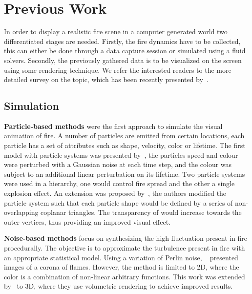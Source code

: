\chapter{Previous Work}
\label{ch:previous_work}

In order to display a realistic fire scene in a computer generated world two differentiated stages are needed.
Firstly, the fire dynamics have to be collected, this can either be done through a data capture session or simulated using a fluid solvers.
Secondly, the previously gathered data is to be visualized on the screen using some rendering technique.
We refer the interested readers to the more detailed survey on the topic, which has been recently presented by~\cite{Huang:2014}.

\section{Simulation}
\label{sec:simulation}


\textbf{Particle-based methods} were the first approach to simulate the visual animation of fire.
A number of particles are emitted from certain locations, each particle has a set of attributes such as shape, velocity, color or lifetime.
The first model with particle systems was presented by~\cite{Reeves:1983}, the particles speed and colour were perturbed with a Gaussian noise at each time step, and the colour was subject to an additional linear perturbation on its lifetime.
Two particle systems were used in a hierarchy, one would control fire spread and the other a single explosion effect.
An extension was proposed by~\cite{Perry:1994}, the authors modified the particle system such that each particle shape would be defined by a series of non-overlapping coplanar triangles.
The transparency of would increase towards the outer vertices, thus providing an improved visual effect.


\textbf{Noise-based methods} focus on synthesizing the high fluctuation present in fire procedurally.
The objective is to approximate the turbulence present in fire with an appropriate statistical model.
Using a variation of Perlin noise, ~\cite{Perlin:1985} presented images of a corona of flames.
However, the method is limited to 2D, where the color is a combination of non-linear arbitrary functions.
This work was extended by~\cite{Perlin:1989} to 3D, where they use volumetric rendering to achieve improved results.

